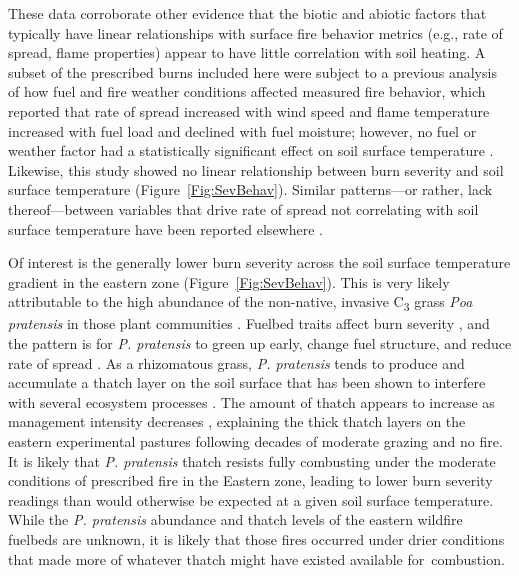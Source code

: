 \documentclass[fire,article,accept,oneauthor,pdftex]{Definitions/mdpi}
\begin{document}
 These data corroborate other evidence that the biotic and abiotic factors that typically have linear relationships with surface fire behavior metrics ({e.g.}, rate of spread, flame properties) appear to have little correlation with soil heating. 
A subset of the prescribed burns included here were subject to a previous analysis of how fuel and fire weather conditions affected measured fire behavior, which reported that rate of spread increased with wind speed and flame temperature increased with fuel load and declined with fuel moisture; however, no fuel or weather factor had a statistically significant effect on soil surface temperature \cite{mcgranahan2023}.
Likewise, this study showed no linear relationship between burn severity and soil surface temperature (Figure~\ref{Fig:SevBehav}).
Similar patterns---or rather, lack thereof---between variables that drive rate of spread not correlating with soil surface temperature have been reported elsewhere \cite{gimeno-garcia2004}. 

Of interest is the generally lower burn severity across the soil surface temperature gradient in the eastern zone (Figure~\ref{Fig:SevBehav}).
This is very likely attributable to the high abundance of the non-native, invasive C\textsubscript{3} grass \emph{Poa pratensis} in those plant communities \cite{duquette2022}.
Fuelbed traits affect burn severity \cite{schwilk2011}, and the pattern is for \emph{P. pratensis} to green up early, change fuel structure, and reduce rate of spread \cite{yurkonis2019}. 
As a rhizomatous grass, \emph{P. pratensis} tends to produce and accumulate a thatch layer on the soil surface that has been shown to interfere with several ecosystem processes \cite{bosy1995,nouwakpo2019, gerhard2022, kjaer2025}. 
The amount of thatch appears to increase as management intensity decreases \cite{shearman1980, kjaer2025}, explaining the thick thatch layers on the eastern experimental pastures following decades of moderate grazing and no fire.
It is likely that \emph{P. pratensis} thatch resists fully combusting under the moderate conditions of prescribed fire in the Eastern zone, leading to lower burn severity readings than would otherwise be expected at a given soil surface temperature. 
While the \emph{P. pratensis} abundance and thatch levels of the eastern wildfire fuelbeds are unknown, it is likely that those fires occurred under drier conditions that made more of whatever thatch might have existed available \mbox{for combustion}. 
\end{document}
